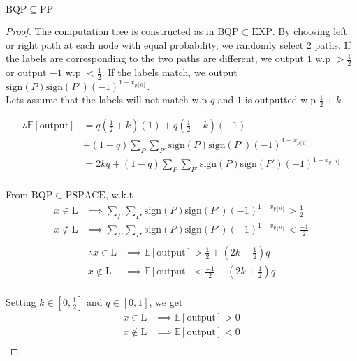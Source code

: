 \documentclass[../main.tex]{subfiles}
\begin{document}
\begin{theorem}
$\mathrm{BQP}\subseteq\mathrm{PP}$
\end{theorem}
\begin{proof}
\noindent The computation tree is constructed as in $\mathrm{BQP}\subset\mathrm{EXP}$. By choosing left or right path at each node with equal probability, we randomly select 2 paths. If the labels are corresponding to the two paths are different, we output $1$ w.p $>\frac{1}{2}$ or output $-1$ w.p $<\frac{1}{2}$. If the labels match, we output $\mathrm{sign}(P)\mathrm{sign}(P\prime)(-1)^{1-x_{p[0]}}$.\\

\noindent Lets assume that the labels will not match w.p $q$ and $1$ is outputted w.p $\frac{1}{2}+k$.

\begin{align*}
    \therefore \mathbb{E}\mathrm{[output]} &= q(\frac{1}{2}+k)(1) + q(\frac{1}{2}-k)(-1)\\
    &+(1-q)\sum_P\sum_{P\prime}\mathrm{sign}(P)\mathrm{sign}(P\prime)(-1)^{1-x_{p[0]}}\\
    &= 2kq +(1-q)\sum_P\sum_{P\prime}\mathrm{sign}(P)\mathrm{sign}(P\prime)(-1)^{1-x_{p[0]}}\\
\end{align*}

\noindent From $\mathrm{BQP}\subset\mathrm{PSPACE}$, w.k.t
\begin{align*}
    x\in\mathrm{L} &\implies \sum_P\sum_{P\prime}\mathrm{sign}(P)\mathrm{sign}(P\prime)(-1)^{1-x_{p[0]}} > \frac{1}{2}\\
    x\not\in\mathrm{L} &\implies \sum_P\sum_{P\prime}\mathrm{sign}(P)\mathrm{sign}(P\prime)(-1)^{1-x_{p[0]}} < \frac{-1}{2}\\
\end{align*}
\begin{align*}
    \therefore x \in \mathrm{L} &\implies \mathbb{E}\mathrm{[output]} > \frac{1}{2} + (2k-\frac{1}{2})q\\
    x \not\in \mathrm{L} &\implies \mathbb{E}\mathrm{[output]} < \frac{-1}{2} + (2k+\frac{1}{2})q\\
\end{align*}

\noindent Setting $k\in[0,\frac{1}{2}]$ and $q\in[0,1]$, we get
\begin{align*}
    x \in \mathrm{L} &\implies \mathbb{E}\mathrm{[output]} > 0\\
    x \not\in \mathrm{L} &\implies \mathbb{E}\mathrm{[output]} < 0\\
\end{align*}
\end{proof}
\end{document}
